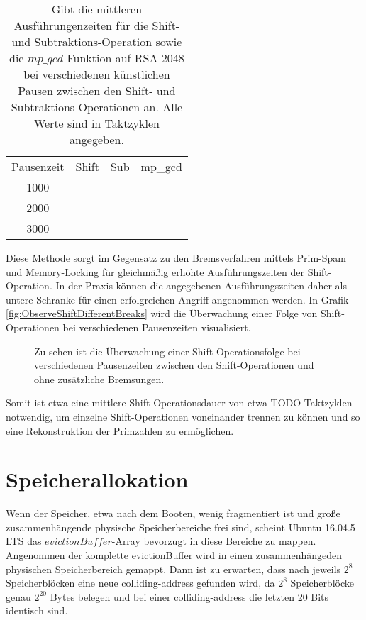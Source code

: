 \begin{table}[h]
\caption{Gibt die mittleren Ausführungenzeiten für die Shift- und Subtraktions-Operation sowie die $mp\_gcd$-Funktion auf RSA-2048 bei verschiedenen künstlichen Pausen zwischen den Shift- und Subtraktions-Operationen an. Alle Werte sind in Taktzyklen angegeben.}
\label{tbl:ArtificialBreaksMeanExecutionTime}
\begin{tabular}{cccc}
Pausenzeit & Shift & Sub & mp\_gcd \\
1000       &       &     &         \\
2000       &       &     &         \\
3000       &       &     &        
\end{tabular}
\end{table}

Diese Methode sorgt im Gegensatz zu den Bremsverfahren mittels Prim-Spam und Memory-Locking für gleichmäßig erhöhte Ausführungszeiten der Shift-Operation.
In der Praxis können die angegebenen Ausführungszeiten daher als untere Schranke für einen erfolgreichen Angriff angenommen werden.
In Grafik \ref{fig:ObserveShiftDifferentBreaks} wird die Überwachung einer Folge von Shift-Operationen bei verschiedenen Pausenzeiten visualisiert.

\label{fig:ObserveShiftDifferentBreaks}
\begin{figure}[h]
\centering
\begin{scaletikzpicturetowidth}{\textwidth}
%
\end{scaletikzpicturetowidth}
\caption{Zu sehen ist die Überwachung einer Shift-Operationsfolge bei verschiedenen Pausenzeiten zwischen den Shift-Operationen und ohne zusätzliche Bremsungen.}
\end{figure}

Somit ist etwa eine mittlere Shift-Operationsdauer von etwa TODO Taktzyklen notwendig, um einzelne Shift-Operationen voneinander trennen zu können und so eine Rekonstruktion der Primzahlen zu ermöglichen.


\section{Speicherallokation}

Wenn der Speicher, etwa nach dem Booten, wenig fragmentiert ist und große zusammenhängende physische Speicherbereiche frei sind, scheint Ubuntu 16.04.5 LTS das $evictionBuffer$-Array bevorzugt in diese Bereiche zu mappen.
Angenommen der komplette evictionBuffer wird in einen zusammenhängeden physischen Speicherbereich gemappt. Dann ist zu erwarten, dass nach jeweils $2^8$ Speicherblöcken eine neue colliding-address gefunden wird, da $2^8$ Speicherblöcke genau $2^{20}$ Bytes belegen und bei einer colliding-address die letzten 20 Bits identisch sind.

